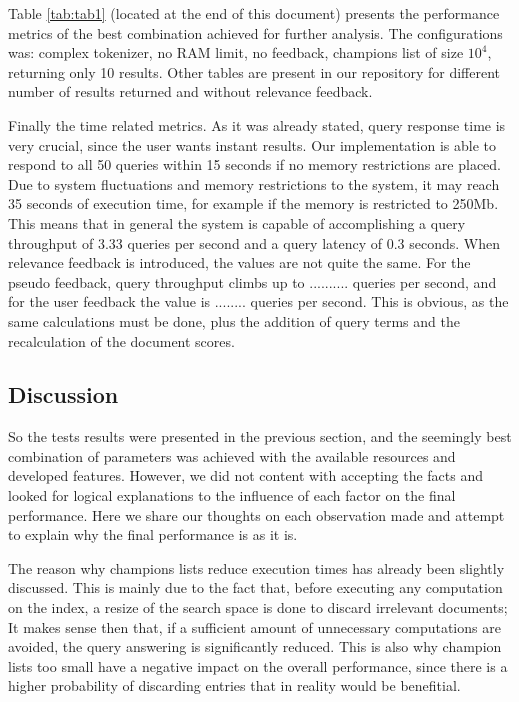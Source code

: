 \documentclass[12pt]{article}
\begin{document}
Table \ref{tab:tab1} (located at the end of this document) presents the performance 
metrics of the best combination achieved for further analysis.
The configurations was: complex tokenizer, no RAM limit, no feedback, champions list of
size $10^4$, returning only 10 results.
Other tables are present in our repository for different number of results returned 
and without relevance feedback.

Finally the time related metrics. 
As it was already stated, query response time is very crucial, since the user wants 
instant results.
Our implementation is able to respond to all 50 queries within 15 seconds if no 
memory restrictions are placed. 
Due to system fluctuations and memory restrictions to the system, it may reach 
35 seconds of execution time, for example if the memory is restricted to 250Mb.
This means that in general the system is capable of accomplishing a query 
throughput of 3.33 queries per second and a query latency of 0.3 seconds.
When relevance feedback is introduced, the values are not quite the same.
For the pseudo feedback, query throughput climbs up to .......... queries per second,
and for the user feedback the value is ........ queries per second.
This is obvious, as the same calculations must be done, plus the addition of query 
terms and the recalculation of the document scores.

\subsection{Discussion}\label{discussion}

So the tests results were presented in the previous section, and the seemingly
best combination of parameters was achieved with the available resources and 
developed features.
However, we did not content with accepting the facts and looked for logical
explanations to the influence of each factor on the final performance.
Here we share our thoughts on each observation made and attempt to explain why
the final performance is as it is.

The reason why champions lists reduce execution times has already been slightly 
discussed. 
This is mainly due to the fact that, before executing any computation on the index,
a resize of the search space is done to discard irrelevant documents;
It makes sense then that, if a sufficient amount of unnecessary computations are 
avoided, the query answering is significantly reduced.
This is also why champion lists too small have a negative impact on the overall 
performance, since there is a higher probability of discarding entries that in 
reality would be benefitial.
\end{document}
